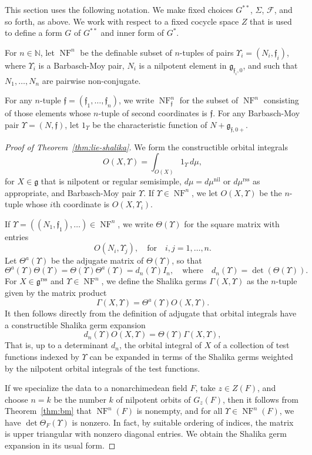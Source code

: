 \documentclass[12pt]{amsart}
\newcommand{\op}[1]{\operatorname{#1}}
\newcommand{\ring}[1]{{\mathbb #1}}
\def\NF{\op{NF}}
\def\Y{\Upsilon}
\def\s{{\mathfrak{f}}}
\newcommand{\cF}{\mathcal{F}}
\newcommand{\fg}{\mathfrak{g}}
\newcommand{\reg}{\mathrm{rss}}
\theoremstyle{plain}
\theoremstyle{definition}
\begin{document}
This section uses the following notation.  We make fixed choices
$G^{**}$, $\Sigma$, $\cF$, and so forth, as above.
We work with respect to a fixed cocycle space $Z$ that is used to
define a form $G$ of $G^{**}$ and inner form of $G^*$.

For $n\in \ring{N}$, let $\NF^n$ be the definable subset of $n$-tuples
of pairs $\Y_i=(N_i,\s_i)$, where $\Y_i$ is a Barbasch-Moy pair, $N_i$
is a nilpotent element in $\fg_{\s_i,0}$, and such that
$N_1,\ldots,N_n$ are pairwise non-conjugate.  

For any $n$-tuple $\s=(\s_1,\ldots,\s_n)$, we write $\NF^n_\s$ for the
subset of $\NF^n$ consisting of those elements whose $n$-tuple of
second coordinates is $\s$.  For any Barbasch-Moy pair $\Y=(N,\s)$,
let $1_\Y$ be the characteristic function of $N+\fg_{\s,0+}$.

\begin{proof}[Proof of Theorem~\ref{thm:lie-shalika}]


We form the constructible orbital integrals
\[
O(X,\Y) = \int_{O(X)} 1_{\Y} \,d\mu,
\]
for $X\in\fg$ that is nilpotent or regular semisimple,
$d\mu=d\mu^{\op{nil}}$ or $d\mu^\reg$ as appropriate, and Barbasch-Moy
pair $\Y$.  If $\Y\in \NF^n$, we let $O(X,\Y)$ be the $n$-tuple whose
$i$th coordinate is $O(X,\Y_i)$.

If $\Y=((N_1,\s_1),\ldots)\in \NF^n$, we write $\Theta(\Y)$ for the
square matrix with entries
\[
O(N_i,\Y_j),\quad\text{for}\quad i,j=1,\ldots,n.
\]
Let $\Theta^a(\Y)$ be the adjugate matrix of $\Theta(\Y)$, so that
\[
\Theta^a(\Y) \Theta(\Y) = \Theta(\Y) \Theta^a(\Y) = d_n(\Y)I_n,\quad 
\text{where}\quad d_n(\Y)=\det (\Theta(\Y)). 
\]
For $X\in \fg^\reg$ and $\Y\in \NF^n$, we define the Shalika germs
$\Gamma(X,\Y)$ as the $n$-tuple given by the matrix product
\[
\Gamma (X,\Y) = \Theta^a (\Y) O(X,\Y).
\]
It then follows directly from the definition of adjugate that orbital
integrals have a constructible Shalika germ expansion
\[
d_n(\Y) O(X,\Y) = \Theta(\Y)\Gamma(X,\Y),
\]
That is, up to a determinant $d_n$, the orbital
integral of $X$ of a collection of test functions indexed by $\Y$ can
be expanded in terms of the Shalika germs weighted by the nilpotent
orbital integrals of the test functions.

If we specialize the data to a nonarchimedean field $F$, take $z\in
Z(F)$, and choose $n=k$ be the number $k$ of nilpotent orbits of $G_z(F)$,
then it follows from Theorem~\ref{thm:bm} that $\NF^n(F)$ is nonempty,
and for all $\Y\in \NF^n(F)$, we have $\det\Theta_F(\Y)$ is
nonzero. In fact, by suitable ordering of indices, the matrix is upper
triangular with nonzero diagonal entries.  We obtain the Shalika germ
expansion in its usual form.
\end{proof}
\end{document}
